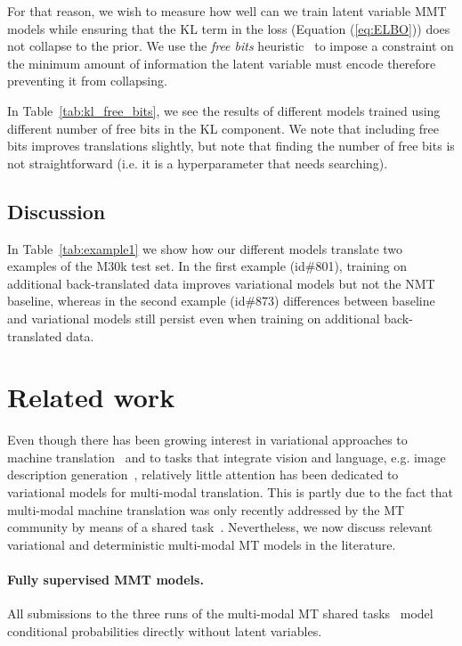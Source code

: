 \documentclass[11pt,a4paper]{article}
\begin{document}
For that reason, we wish to measure how well can we train latent variable MMT models while ensuring that the KL term in the loss (Equation (\ref{eq:ELBO})) does not collapse to the prior.
We use the \emph{free bits} heuristic~\citep{Kingmaetal2016} to impose a constraint on the minimum amount of information the latent variable must encode therefore preventing it from collapsing.

In Table~\ref{tab:kl_free_bits}, we see the results of different models trained using different number of free bits in the KL component.
We note that including free bits improves translations slightly, but note that finding the number of free bits is not straightforward (i.e. it is a hyperparameter that needs searching).

\subsection{Discussion}
\label{sec:discussion}
In Table~\ref{tab:example1} we show how our different models translate two examples of the M30k test set.
In the first example (id\#801), training on additional back-translated data improves variational models but not the NMT baseline, whereas in the second example (id\#873) differences between baseline and variational models still persist even when training on additional back-translated data.
 
\section{Related work}
\label{sec:related}

Even though there has been growing interest in variational approaches to machine translation~\citep{Zhangetal2016,SchulzAzizCohn2018_ACL,ShahBarber2018_NIPS} and to tasks that integrate vision and language, e.g. image description generation~\citep{Yunchenetal2016_NIPS,Wangetal2017_NIPS}, relatively little attention has been dedicated to variational models for multi-modal translation.
This is partly due to the fact that multi-modal machine translation was only recently addressed by the MT community by means of a shared task~\cite{Speciaetal2016,Elliottetal2017,Barraultetal2018}.
Nevertheless, we now discuss relevant variational and deterministic multi-modal MT models in the literature.

\paragraph{Fully supervised MMT models.} All submissions to the three runs of the multi-modal MT shared tasks~\citep{Speciaetal2016,Elliottetal2017,Barraultetal2018} model conditional probabilities directly without latent variables.
\end{document}
